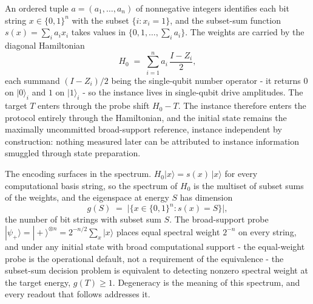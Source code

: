 An ordered tuple $a = (a_1, \dots, a_n)$ of nonnegative integers identifies each bit string $x \in \{0,1\}^n$ with the subset $\{i : x_i = 1\}$, and the subset-sum function $s(x) = \sum_i a_i x_i$ takes values in $\{0, 1, \dots, \sum_i a_i\}$. The weights are carried by the diagonal Hamiltonian
\begin{equation}\label{def:hamiltonian-h0}
H_0 \;=\; \sum_{i=1}^{n} a_i\, \frac{I - Z_i}{2},
\end{equation}
each summand $(I - Z_i)/2$ being the single-qubit number operator - it returns $0$ on $|0\rangle_i$ and $1$ on $|1\rangle_i$ - so the instance lives in single-qubit drive amplitudes. The target $T$ enters through the probe shift $H_0 - T$. The instance therefore enters the protocol entirely through the Hamiltonian, and the initial state remains the maximally uncommitted broad-support reference, instance independent by construction: nothing measured later can be attributed to instance information smuggled through state preparation.

The encoding surfaces in the spectrum. $H_0 |x\rangle = s(x)\, |x\rangle$ for every computational basis string, so the spectrum of $H_0$ is the multiset of subset sums of the weights, and the eigenspace at energy $S$ has dimension
\begin{equation}\label{def:degeneracy}
g(S) \;=\; \bigl|\{x \in \{0,1\}^n : s(x) = S\}\bigr|,
\end{equation}
the number of bit strings with subset sum $S$. The broad-support probe $|\psi_+\rangle = |+\rangle^{\otimes n} = 2^{-n/2} \sum_x |x\rangle$ places equal spectral weight $2^{-n}$ on every string, and under any initial state with broad computational support - the equal-weight probe is the operational default, not a requirement of the equivalence - the subset-sum decision problem is equivalent to detecting nonzero spectral weight at the target energy, $g(T) \ge 1$. Degeneracy is the meaning of this spectrum, and every readout that follows addresses it.

